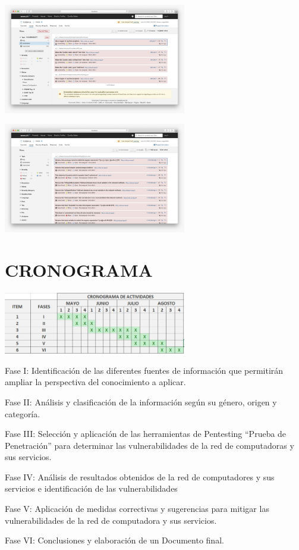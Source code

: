 \documentclass[twoside,twocolumn]{article}
\begin{document}
\begin{center}
    \includegraphics[width=8cm]{Pentesting/Imagenes/WhatsApp Image 2020-06-23 at 3.57.32 PM.jpeg}
    
    \includegraphics[width=8cm]{Pentesting/Imagenes/WhatsApp Image 2020-06-23 at 3.59.25 PM.jpeg}
    
    
\end{center}
\section{CRONOGRAMA}
\begin{center}


	\includegraphics[width=8cm]{./Imagenes/CRONOGRAMA} 
	\end{center}
\item Fase I: Identificación de las diferentes fuentes de información que permitirán ampliar la
perspectiva del conocimiento a aplicar.
\item Fase II: Análisis y clasificación de la información según su género, origen y categoría. 
\item Fase III: Selección y aplicación de las herramientas de Pentesting “Prueba de Penetración”
para determinar las vulnerabilidades de la red de computadoras y sus servicios.
\item Fase IV: Análisis de resultados obtenidos de la red de computadores y sus servicios e
identificación de las vulnerabilidades
\item Fase V: Aplicación de medidas correctivas y sugerencias para mitigar las vulnerabilidades
de la red de computadora y sus servicios.
\item Fase VI: Conclusiones y elaboración de un Documento final.
\end{document}
